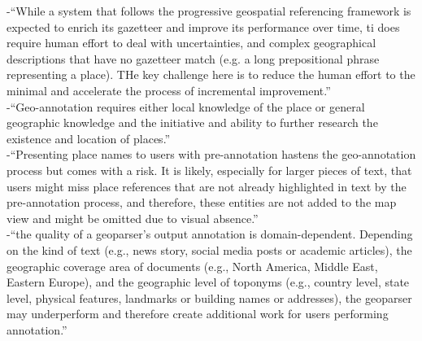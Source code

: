 -{\color{orange}“While a system that follows the progressive geospatial referencing framework is expected to enrich its gazetteer and improve its performance over time, ti does require human effort to deal with uncertainties, and complex geographical descriptions that have no gazetteer match (e.g. a long prepositional phrase representing a place). THe key challenge here is to reduce the human effort to the minimal and accelerate the process of incremental improvement.”\cite{Cai2016}}\\
-{\color{orange}“Geo-annotation requires either local knowledge of the place or general geographic knowledge and the initiative and ability to further research the existence and location of places.”\cite{Karimzadeh2019}}\\
-{\color{orange}“Presenting place names to users with pre-annotation hastens the geo-annotation process but comes with a risk. It is likely, especially for larger pieces of text, that users might miss place references that are not already highlighted in text by the pre-annotation process, and therefore, these entities are not added to the map view and might be omitted due to visual absence.”\cite{Karimzadeh2019}}\\
-{\color{orange}“the quality of a geoparser’s output annotation is domain-dependent. Depending on the kind of text (e.g., news story, social media posts or academic articles), the geographic coverage area of documents (e.g., North America, Middle East, Eastern Europe), and the geographic level of toponyms (e.g., country level, state level, physical features, landmarks or building names or addresses), the geoparser may underperform and therefore create additional work for users performing annotation.”\cite{Karimzadeh2019}}\\



